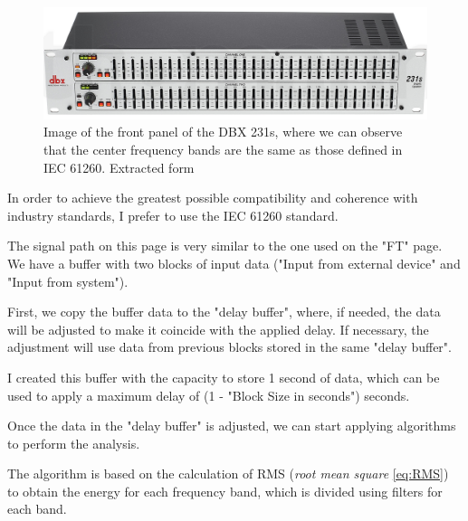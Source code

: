 \begin{figure}[H]
	\centering
	\includegraphics[width=1
	\linewidth]{Figures/DBX_231s.png}
	\caption[Image of the front panel of the DBX 231s]{Image of the front panel of the DBX 231s, where we can observe that the center frequency bands are the same as those defined in IEC 61260. Extracted form \cite{DBX_31s}}
	\label{fig:DBX_31s}
\end{figure}

In order to achieve the greatest possible compatibility and coherence with industry standards, I prefer to use the IEC 61260 standard.


The signal path on this page is very similar to the one used on the "FT" page. We have a buffer with two blocks of input data ("Input from external device" and "Input from system").

First, we copy the buffer data to the "delay buffer", where, if needed, the data will be adjusted to make it coincide with the applied delay. If necessary, the adjustment will use data from previous blocks stored in the same "delay buffer".

I created this buffer with the capacity to store 1 second of data, which can be used to apply a maximum delay of (1 - "Block Size in seconds") seconds.

Once the data in the "delay buffer" is adjusted, we can start applying algorithms to perform the analysis.

The algorithm is based on the calculation of RMS (\textit{root mean square} \ref{eq:RMS}) to obtain the energy for each frequency band, which is divided using filters for each band.


